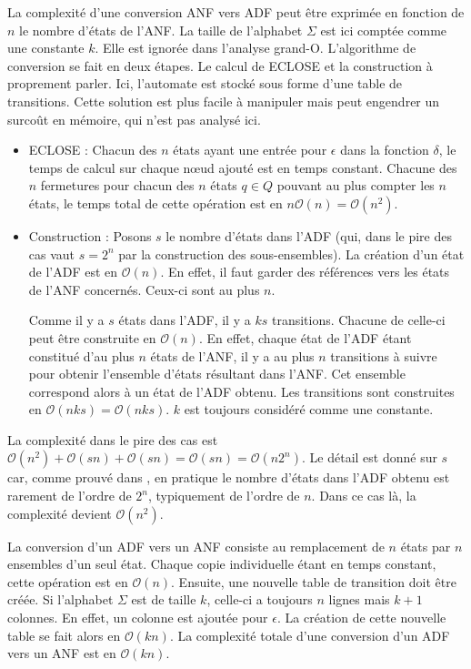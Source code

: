 \begin{complexity}

	La complexité d'une conversion ANF vers ADF peut être exprimée en fonction de $n$ le nombre d'états de l'ANF. La taille de l'alphabet $\Sigma$ est ici comptée comme une constante $k$. Elle est ignorée dans l'analyse grand-O. L'algorithme de conversion se fait en deux étapes. Le calcul de ECLOSE et la construction à proprement parler. Ici, l'automate est stocké sous forme d'une table de transitions. Cette solution est plus facile à manipuler mais peut engendrer un surcoût en mémoire, qui n'est pas analysé ici.

	\begin{itemize}
		\item ECLOSE : Chacun des $n$ états ayant une entrée pour $\epsilon$ dans la fonction $\delta$, le temps de calcul sur chaque nœud ajouté est en temps constant. Chacune des $n$ fermetures pour chacun des $n$ états $q \in Q$ pouvant au plus compter les $n$ états, le temps total de cette opération est en $n\mathcal{O}(n)=\mathcal{O}(n^2)$.

		\item Construction : Posons $s$ le nombre d'états dans l'ADF (qui, dans le pire des cas vaut $s=2^n$ par la construction des sous-ensembles). La création d'un état de l'ADF est en $\mathcal{O}(n)$. En effet, il faut garder des références vers les états de l'ANF concernés. Ceux-ci sont au plus $n$.

    Comme il y a $s$ états dans l'ADF, il y a $ks$ transitions. Chacune de celle-ci peut être construite en $\mathcal{O}(n)$. En effet, chaque état de l'ADF étant constitué d'au plus $n$ états de l'ANF, il y a au plus $n$ transitions à suivre pour obtenir l'ensemble d'états résultant dans l'ANF. Cet ensemble correspond alors à un état de l'ADF obtenu. Les transitions sont construites en $\mathcal{O}(nks)=\mathcal{O}(nks)$. $k$ est toujours considéré comme une constante.

	\end{itemize}

	La complexité dans le pire des cas est $\mathcal{O}(n^2) + \mathcal{O}(sn) + \mathcal{O}(sn) = \mathcal{O}(sn)=\mathcal{O}(n2^n)$.
	Le détail est donné sur $s$ car, comme prouvé dans \cite{Hopcroft00}, en pratique le nombre d'états dans l'ADF obtenu est rarement de l'ordre de $2^n$, typiquement de l'ordre de $n$. Dans ce cas là, la complexité devient $\mathcal{O}(n^2)$.

\end{complexity}


\begin{complexity}
	La conversion d'un ADF \automaton vers un ANF consiste au remplacement de $n$ états par $n$ ensembles d'un seul état. Chaque copie individuelle étant en temps constant, cette opération est en $\mathcal{O}(n)$.
  Ensuite, une nouvelle table de transition doit être créée. Si l'alphabet $\Sigma$ est de taille $k$, celle-ci a toujours $n$ lignes mais $k+1$ colonnes. En effet, un colonne est ajoutée pour $\epsilon$. La création de cette nouvelle table se fait alors en $\mathcal{O}(kn)$.
	La complexité totale d'une conversion d'un ADF vers un ANF est en $\mathcal{O}(kn)$.
\end{complexity}
